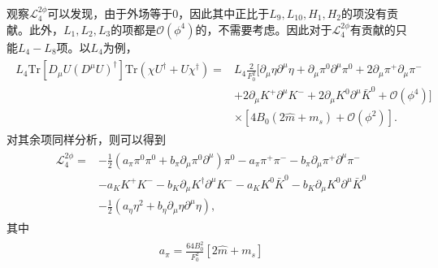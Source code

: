 \documentclass[aps,tightenlines,16pt]{ctexart}
\numberwithin{equation}{section}
\newcommand{\mL}{\mathcal{L}}
\newcommand{\Tr}{\text{Tr}}
\begin{document}
观察$\mL_4^{2\phi}$可以发现，由于外场等于0，因此其中正比于$L_9,L_{10},H_1,H_2$的项没有贡献。此外，$L_1,L_2,L_3$的项都是$\mathcal{O}(\phi^4)$的，不需要考虑。因此对于$\mL_4^{2\phi}$有贡献的只能$L_4-L_8$项。以$L_4$为例，
\begin{align}
   \begin{aligned}
      L_4\Tr[D_{\mu}U(D^{\mu}U)^{\dagger}]\Tr(\chi U^{\dagger}+U\chi^{\dagger}) =& L_4\frac{2}{F_0^2}[\partial_{\mu}\eta \partial^{\mu}\eta + \partial_{\mu}\pi^0 \partial^{\mu}\pi^0+2\partial_{\mu}\pi^+\partial_{\mu}\pi^-
      \\
      &+2\partial_{\mu}K^+\partial^{\mu}K^-+2\partial_{\mu}K^0\partial^{\mu}\bar{K}^0+\mathcal{O}(\phi^4)]\\
      &\times [4B_0(2\hat{m}+m_s)+\mathcal{O}(\phi^2)].
   \end{aligned}
\end{align}
对其余项同样分析，则可以得到
\begin{align}
   \begin{aligned}
   \mL_4^{2\phi} =&-\frac{1}{2}(a_{\pi}\pi^0\pi^0+b_{\pi}\partial_{\mu}\pi^0\partial^{\mu})\pi^0 -a_{\pi} \pi^{+}\pi^{-} -b_{\pi}\partial_{\mu}\pi^{+}\partial^{\mu}\pi^{-}\\
   &-a_K K^+K^--b_K\partial_{\mu}K^{\dagger}\partial^{\mu}K^- -a_K K^0 \bar{K}^0 -b_K \partial_{\mu}K^0\partial^{\mu}\bar{K}^0\\
   &-\frac{1}{2}(a_{\eta}\eta^2+b_{\eta}\partial_{\mu}\eta\partial^{\mu}\eta),
   \end{aligned}
\end{align}
其中
\begin{align}
   \begin{aligned}
      a_{\pi} = \frac{64B_0^2}{F_0^2}[2\hat{m}+m_s]
   \end{aligned}
\end{align}





















\newpage 

\renewcommand\refname{参考文献}




\end{document}
